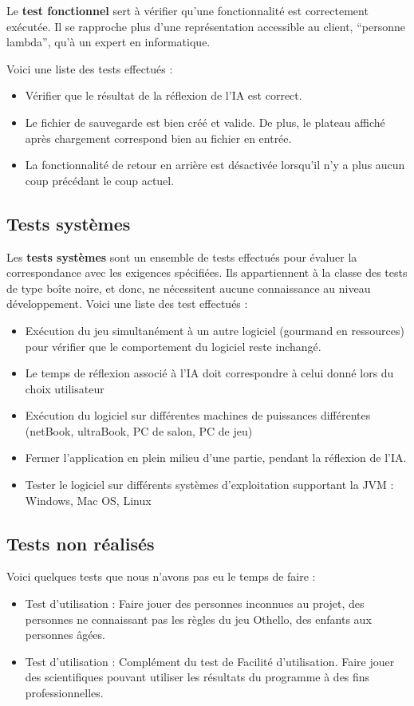 \documentclass[a4paper,12pt]{report}
\begin{document}
Le \textbf{test fonctionnel} sert à vérifier qu’une fonctionnalité est correctement exécutée. Il se rapproche plus d’une représentation accessible au client, “personne lambda”, qu’à un expert en informatique.

Voici une liste des tests effectués :
\begin{itemize}
\item Vérifier que le résultat de la réflexion de l’IA est correct.
\item Le fichier de sauvegarde est bien créé et valide. De plus, le plateau affiché après chargement correspond bien au fichier en entrée.
\item La fonctionnalité de retour en arrière est désactivée lorsqu’il n’y a plus aucun coup précédant le coup actuel.
\end{itemize}

\subsection{Tests systèmes}

Les \textbf{tests systèmes} sont un ensemble de tests effectués pour évaluer la correspondance avec les exigences spécifiées. Ils appartiennent à la classe des tests de type boîte noire, et donc, ne nécessitent aucune connaissance au niveau développement.
Voici une liste des test effectués :
\begin{itemize}
\item Exécution du jeu simultanément à un autre logiciel (gourmand en ressources) pour vérifier que le comportement du logiciel reste inchangé.
\item Le temps de réflexion associé à l’IA doit correspondre à celui donné lors du choix utilisateur
\item Exécution du logiciel sur différentes machines de puissances différentes (netBook, ultraBook, PC de salon, PC de jeu)
\item Fermer l’application en plein milieu d’une partie, pendant la réflexion de l’IA.
\item Tester le logiciel sur différents systèmes d’exploitation supportant la JVM : Windows, Mac OS, Linux
\end{itemize}

\subsection{Tests non réalisés}

Voici quelques tests que nous n'avons pas eu le temps de faire :
\begin{itemize}
\item Test d’utilisation : Faire jouer des personnes inconnues au projet, des personnes ne connaissant pas les règles du jeu Othello, des enfants aux personnes âgées.
\item Test d’utilisation : Complément du test de Facilité d’utilisation. Faire jouer des scientifiques pouvant utiliser les résultats du programme à des fins professionnelles.
\end{itemize}
\end{document}
